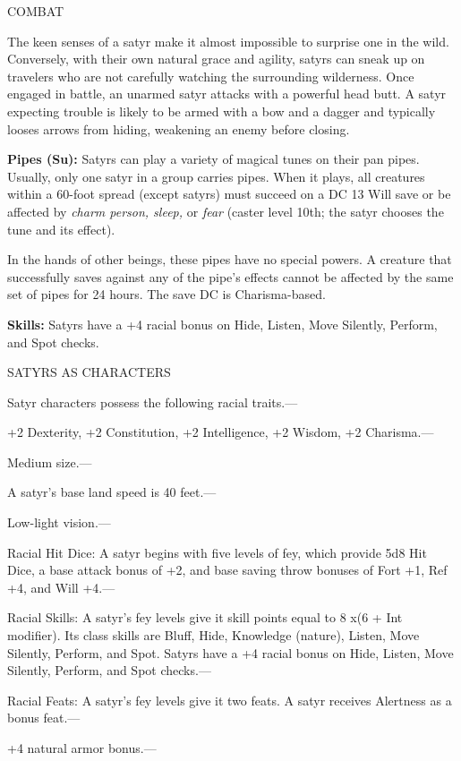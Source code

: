 \documentclass{article}
\begin{document}
COMBAT

The keen senses of a satyr make it almost impossible to surprise one in the wild. 
Conversely, with their own natural grace and agility, satyrs can sneak up on travelers 
who are not carefully watching the surrounding wilderness. Once engaged in battle, 
an unarmed satyr attacks with a powerful head butt. A satyr expecting trouble is 
likely to be armed with a bow and a dagger and typically looses arrows from hiding, 
weakening an enemy before closing. 

\textbf{Pipes (Su):} Satyrs can play a variety of magical tunes on their pan pipes. 
Usually, only one satyr in a group carries pipes. When it plays, all creatures 
within a 60-foot spread (except satyrs) must succeed on a DC 13 Will save or be 
affected by \textit{charm person, sleep, }or \textit{fear }(caster level 10th; 
the satyr chooses the tune and its effect).

In the hands of other beings, these pipes have no special powers. A creature that 
successfully saves against any of the pipe's effects cannot be affected by the 
same set of pipes for 24 hours. The save DC is Charisma-based.

\textbf{Skills:} Satyrs have a +4 racial bonus on Hide, Listen, Move Silently, 
Perform, and Spot checks.

SATYRS AS CHARACTERS

Satyr characters possess the following racial traits.--- 

\parindent=3pt
+2 Dexterity, +2 Constitution, +2 Intelligence, +2 Wisdom, +2 Charisma.---

\parindent=0pt
Medium size.---

A satyr's base land speed is 40 feet.---

Low-light vision.---

Racial Hit Dice: A satyr begins with five levels of fey, which provide 5d8 Hit 
Dice, a base attack bonus of +2, and base saving throw bonuses of Fort +1, Ref 
+4, and Will +4.---

Racial Skills: A satyr's fey levels give it skill points equal to 8 x$ $(6 + Int 
modifier). Its class skills are Bluff, Hide, Knowledge (nature), Listen, Move Silently, 
Perform, and Spot. Satyrs have a +4 racial bonus on Hide, Listen, Move Silently, 
Perform, and Spot checks.---

Racial Feats: A satyr's fey levels give it two feats. A satyr receives Alertness 
as a bonus feat.--- 

\parindent=3pt
+4 natural armor bonus.---
\end{document}
